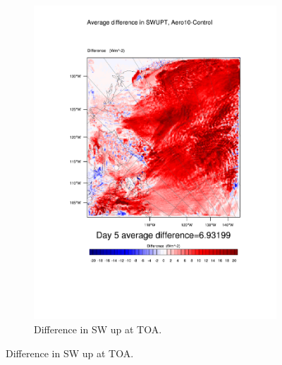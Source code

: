 \begin{figure}
\begin{subfigure}{0.48\textwidth}
		\includegraphics[width=\textwidth]{results/aero10/diff_Aero10_SWUPT_Day5.pdf}
		\caption{Difference in SW up at TOA.}
		\label{subfig:swup_r3Day5}
	\end{subfigure}
	

\end{figure}
